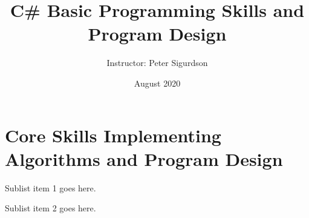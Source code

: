 \documentclass{article}
\title{C\# Basic Programming Skills and Program Design}
\author{Instructor: Peter Sigurdson }
\date{August 2020}
\begin{document}
\maketitle

\section * {Core Skills Implementing Algorithms and Program Design}
    \begin{todolist}
      \item Sublist item 1 goes here.
      \item Sublist item 2 goes here.
    \end{todolist}

  \begin{itemize}[label={$\bullet$}]


\end{itemize}
\end{document}
